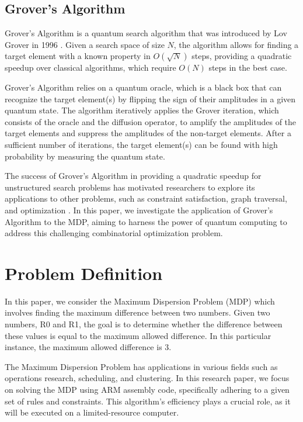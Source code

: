 \subsection{Grover's Algorithm}
Grover's Algorithm is a quantum search algorithm that was introduced by Lov Grover in 1996 \cite{grover}. Given a search space of size $N$, the algorithm allows for finding a target element with a known property in $O(\sqrt{N})$ steps, providing a quadratic speedup over classical algorithms, which require $O(N)$ steps in the best case.

Grover's Algorithm relies on a quantum oracle, which is a black box that can recognize the target element(s) by flipping the sign of their amplitudes in a given quantum state. The algorithm iteratively applies the Grover iteration, which consists of the oracle and the diffusion operator, to amplify the amplitudes of the target elements and suppress the amplitudes of the non-target elements. After a sufficient number of iterations, the target element(s) can be found with high probability by measuring the quantum state.

The success of Grover's Algorithm in providing a quadratic speedup for unstructured search problems has motivated researchers to explore its applications to other problems, such as constraint satisfaction, graph traversal, and optimization \cite{grover_applications}. In this paper, we investigate the application of Grover's Algorithm to the MDP, aiming to harness the power of quantum computing to address this challenging combinatorial optimization problem.

\section{Problem Definition}
In this paper, we consider the Maximum Dispersion Problem (MDP) which involves finding the maximum difference between two numbers. Given two numbers, R0 and R1, the goal is to determine whether the difference between these values is equal to the maximum allowed difference. In this particular instance, the maximum allowed difference is 3. 

The Maximum Dispersion Problem has applications in various fields such as operations research, scheduling, and clustering. In this research paper, we focus on solving the MDP using ARM assembly code, specifically adhering to a given set of rules and constraints. This algorithm's efficiency plays a crucial role, as it will be executed on a limited-resource computer.


